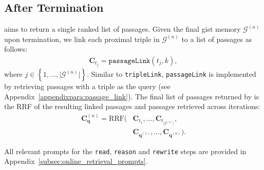 \subsection{After Termination}
\gear aims to return a single ranked list of passages. Given the final gist memory $\mathcal{G}^{(n)}$ upon termination, we link each proximal triple in $\mathcal{G}^{(n)}$ to a list of passages as follows:
\begin{align}
    \mathbf{C}_{t_j} = \texttt{passageLink}\left(t_j, k\right),
\end{align}
where $j \in \left \{1, \dots, \vert\mathcal{G}^{(n)}\vert \right \}$. Similar to \texttt{tripleLink}, \texttt{passageLink} is implemented by retrieving passages with a triple as the query (see Appendix~\ref{appendixpara:passage_link}). The final list of passages returned by \gear is the RRF of the resulting linked passages and passages retrieved across iterations:
\begin{align}
\mathbf{C}_\mathbf{q}^{(n)} = \mathrm{RRF}\big(&\mathbf{C}_{t_1}, \ldots,\mathbf{C}_{t_{\vert\mathcal{G}^{(n)}\vert}}, \nonumber\\
    &\mathbf{C}_{\mathbf{q}^{(1)}}, \ldots, \mathbf{C}_{\mathbf{q}^{(n)}} \big).
\end{align}

All relevant prompts for the \texttt{read}, \texttt{reason} and \texttt{rewrite} steps are provided in Appendix~\ref{subsec:online_retrieval_prompts}.
